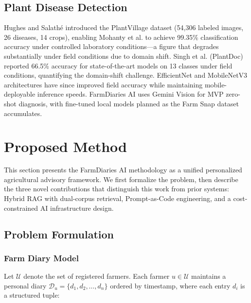 \documentclass[conference]{IEEEtran}
\begin{document}
\subsection{Plant Disease Detection}

Hughes and Salath{\'e} \cite{hughes2015} introduced the PlantVillage dataset (54,306 labeled images, 26 diseases, 14 crops), enabling Mohanty et al. \cite{mohanty2016} to achieve 99.35\% classification accuracy under controlled laboratory conditions---a figure that degrades substantially under field conditions due to domain shift. Singh et al. \cite{singh2020} (PlantDoc) reported 66.5\% accuracy for state-of-the-art models on 13 classes under field conditions, quantifying the domain-shift challenge. EfficientNet \cite{tan2019} and MobileNetV3 \cite{howard2019} architectures have since improved field accuracy while maintaining mobile-deployable inference speeds. FarmDiaries AI uses Gemini Vision for MVP zero-shot diagnosis, with fine-tuned local models planned as the Farm Snap dataset accumulates.


\section{Proposed Method}

This section presents the FarmDiaries AI methodology as a unified
personalized agricultural advisory framework. We first formalize the
problem, then describe the three novel contributions that distinguish
this work from prior systems: Hybrid RAG with dual-corpus retrieval,
Prompt-as-Code engineering, and a cost-constrained AI infrastructure
design.

\subsection{Problem Formulation}

\subsubsection{Farm Diary Model}

Let $\mathcal{U}$ denote the set of registered farmers. Each farmer
$u \in \mathcal{U}$ maintains a personal diary
$\mathcal{D}_u = \{d_1, d_2, \ldots, d_n\}$ ordered by timestamp,
where each entry $d_i$ is a structured tuple:
\end{document}
